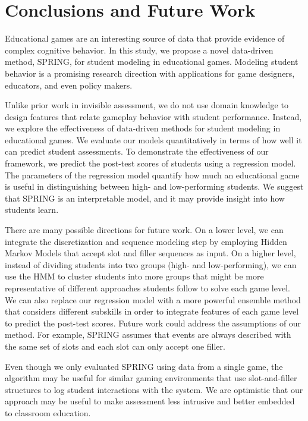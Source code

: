 \documentclass{sigchi}
\def\algname{SPRING\xspace}
\begin{document}
	\section{Conclusions and Future Work}
	\label{sec:conclusion} 
	
	Educational games are an interesting source of data that provide evidence of complex cognitive behavior.
	In this study, we propose a novel data-driven method, \algname,  for student modeling in educational games. 	
	Modeling student behavior  is a promising research direction with applications for game designers, educators, and even policy makers.
	
	Unlike prior work in invisible assessment, we do not use domain knowledge to design features that relate gameplay behavior with student performance.
	Instead, we  explore the effectiveness of data-driven methods for student modeling in educational games.
	We evaluate our models quantitatively in terms of how well it can predict student assessments.
	To demonstrate the effectiveness of our framework, we predict the post-test scores of students using a regression model.
	The parameters of the regression model quantify how much an educational game is useful in distinguishing between high- and low-performing students.
	We suggest that \algname is an interpretable model, and it may provide insight into how students learn.


	There are many possible directions for future work. 
	On a lower level, we can integrate the discretization and sequence modeling step by employing Hidden Markov Models that accept slot and filler sequences as input.
	On a higher level, instead of dividing students into two groups (high- and low-performing), we can use the HMM to cluster students \cite{bicego2003similarity,smyth1997clustering} into more groups that might be  more representative of different approaches students follow to solve each game level. 
	We can also replace our regression model with a more powerful ensemble method that considers different subskills in order to integrate features of each game level to predict the post-test scores.
	Future work could address the assumptions of our method.
	For example, \algname assumes that events are always described with the same set of slots and each slot can only accept one filler.
	
	Even though we only evaluated \algname using data from a single game, the algorithm  may be useful for similar gaming environments that use slot-and-filler structures to log student interactions with the system. 
	We are optimistic that our approach may be useful to make assessment less intrusive and better embedded to classroom education.

	
	\balance
	
	
\end{document}
